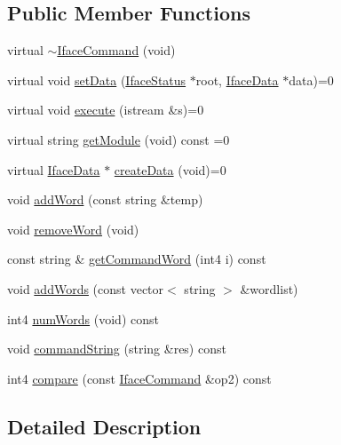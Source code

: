 \subsection*{Public Member Functions}
\begin{DoxyCompactItemize}
\item 
virtual \mbox{\hyperlink{class_iface_command_a65ac5123dcffa1b002ad628971da6b1f}{$\sim$\+Iface\+Command}} (void)
\item 
virtual void \mbox{\hyperlink{class_iface_command_ad0a0ba80d392ef1346c43283a8c3ca90}{set\+Data}} (\mbox{\hyperlink{class_iface_status}{Iface\+Status}} $\ast$root, \mbox{\hyperlink{class_iface_data}{Iface\+Data}} $\ast$data)=0
\item 
virtual void \mbox{\hyperlink{class_iface_command_af10e29cee2c8e419de6efe9e680ad201}{execute}} (istream \&s)=0
\item 
virtual string \mbox{\hyperlink{class_iface_command_a06f9500f4b0a0e3cf14010cf133502d5}{get\+Module}} (void) const =0
\item 
virtual \mbox{\hyperlink{class_iface_data}{Iface\+Data}} $\ast$ \mbox{\hyperlink{class_iface_command_a908e484baf6e090b46ceb2ccaea8139d}{create\+Data}} (void)=0
\item 
void \mbox{\hyperlink{class_iface_command_a6b4cf9ece6453e1436aad4f8ab49b9d4}{add\+Word}} (const string \&temp)
\item 
void \mbox{\hyperlink{class_iface_command_a3e03d5f1a16602448b7b52021ba2e223}{remove\+Word}} (void)
\item 
const string \& \mbox{\hyperlink{class_iface_command_a76d8a2f37203ae55e9c26d73c5ede829}{get\+Command\+Word}} (int4 i) const
\item 
void \mbox{\hyperlink{class_iface_command_afbbaea977f2a7cd6de3339a6a737e7a6}{add\+Words}} (const vector$<$ string $>$ \&wordlist)
\item 
int4 \mbox{\hyperlink{class_iface_command_a7c0af3d7dffccc33423b231cce94bb40}{num\+Words}} (void) const
\item 
void \mbox{\hyperlink{class_iface_command_a4ee3f097c09e0ede38ce8e37a64cb458}{command\+String}} (string \&res) const
\item 
int4 \mbox{\hyperlink{class_iface_command_a7517eda70ce8d1ca6ed564e475b02f9f}{compare}} (const \mbox{\hyperlink{class_iface_command}{Iface\+Command}} \&op2) const
\end{DoxyCompactItemize}


\subsection{Detailed Description}


